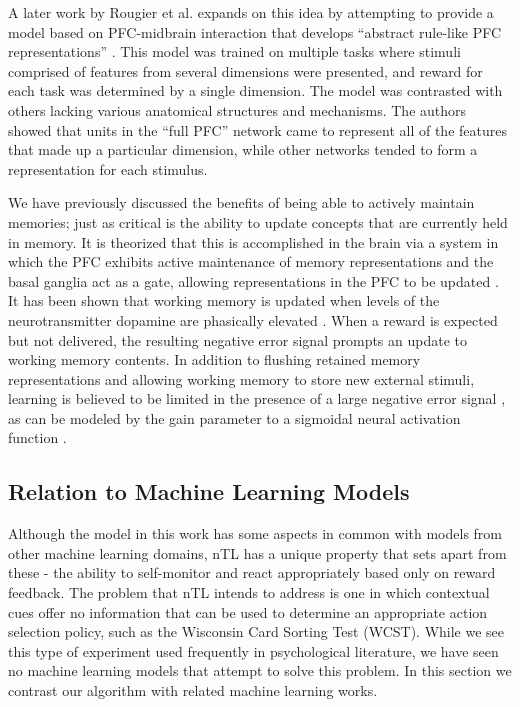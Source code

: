\documentclass[10pt,letterpaper]{article}
\begin{document}
A later work by Rougier et al. expands on this idea by attempting to provide a model based on PFC-midbrain interaction that develops ``abstract rule-like PFC representations'' \cite{rougier_prefrontal_2005}. This model was trained on multiple tasks where stimuli comprised of features from several dimensions were presented, and reward for each task was determined by a single dimension. The model was contrasted with others lacking various anatomical structures and mechanisms. The authors showed that units in the ``full PFC'' network came to represent all of the features that made up a particular dimension, while other networks tended to form a representation for each stimulus.

We have previously discussed the benefits of being able to actively maintain memories; just as critical is the ability to update concepts that are currently held in memory. It is theorized that this is accomplished in the brain via a system in which the PFC exhibits active maintenance of memory representations and the basal ganglia act as a gate, allowing representations in the PFC to be updated \cite{frank_interactions_2001,chatham_multiple_2015,chatham_corticostriatal_2014,rougier_prefrontal_2005,kriete_indirection_2013,kriete_generalisation_2011}. It has been shown that working memory is updated when levels of the neurotransmitter dopamine are phasically elevated \cite{frank_interactions_2001,chatham_multiple_2015,kriete_generalisation_2011,rougier_prefrontal_2005,niv_reinforcement_2015}. When a reward is expected but not delivered, the resulting negative error signal prompts an update to working memory contents. In addition to flushing retained memory representations and allowing working memory to store new external stimuli, learning is believed to be limited in the presence of a large negative error signal \cite{chatham_multiple_2015,oreilly_biologically_2006}, as can be modeled by the gain parameter to a sigmoidal neural activation function \cite{frank_interactions_2001,oreilly_making_2006}.

\subsection{Relation to Machine Learning Models}

Although the model in this work has some aspects in common with models from other machine learning domains, nTL has a unique property that sets apart from these - the ability to self-monitor and react appropriately based only on reward feedback. The problem that nTL intends to address is one in which contextual cues offer no information that can be used to determine an appropriate action selection policy, such as the Wisconsin Card Sorting Test (WCST). While we see this type of experiment used frequently in psychological literature, we have seen no machine learning models that attempt to solve this problem. In this section we contrast our algorithm with related machine learning works.
\end{document}
